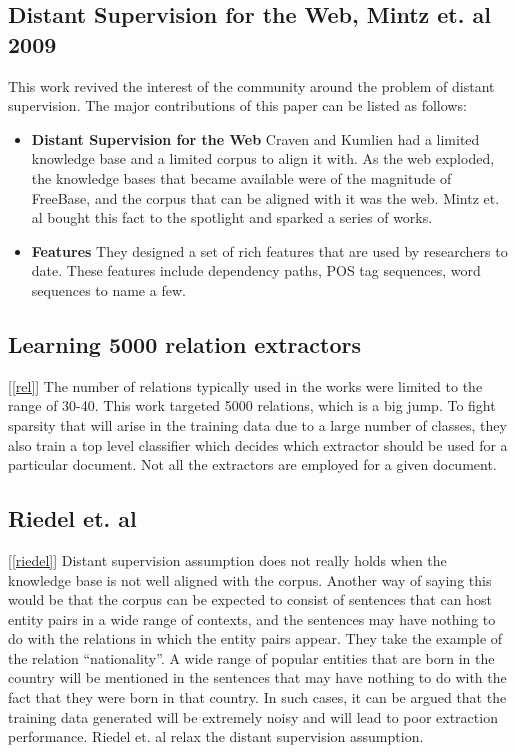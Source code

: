 \documentclass[a4paper,10pt]{article}
\begin{document}
\subsection{Distant Supervision for the Web, Mintz et. al 2009}
This work revived the interest of the community around the problem of distant supervision.
The major contributions of this paper can be listed as follows:
\begin{itemize}
 \item \textbf{Distant Supervision for the Web}
 Craven and Kumlien had a limited knowledge base and a limited corpus to align it with.
 As the web exploded, the knowledge bases that became available were of the magnitude of FreeBase, and the
 corpus that can be aligned with it was the web. Mintz et. al bought this fact to the spotlight and sparked 
 a series of works.
 
 \item \textbf{Features}
 They designed a set of rich features that are used by researchers to date. These features include dependency paths, POS tag sequences, word sequences to name a few.
 
\end{itemize}

\subsection{Learning 5000 relation extractors} [\ref{rel}]
The number of relations typically used in the works were limited to the range of 30-40. 
This work targeted 5000 relations, which is a big jump. To fight sparsity that will arise 
in the training data due to a large number of classes, they also train a top level classifier
which decides which extractor should be used for a particular document. Not all the extractors 
are employed for a given document.

\subsection{Riedel et. al}[\ref{riedel}]
Distant supervision assumption does not really holds when the knowledge base is not well aligned with the corpus.
Another way of saying this would be that the corpus can be expected to consist of sentences that can host entity pairs
in a wide range of contexts, and the sentences may have nothing to do with the relations in which the entity pairs appear.
They take the example of the relation ``nationality''. A wide range of popular entities that are born in the country 
will be mentioned in the sentences that may have nothing to do with the fact that they were born in that country.
In such cases, it can be argued that the training data generated will be extremely noisy and will lead to poor extraction 
performance. Riedel et. al relax the distant supervision assumption.
\end{document}
